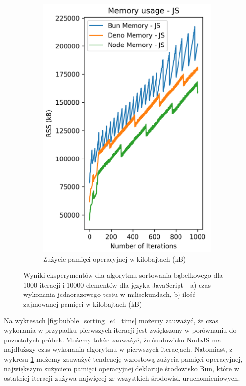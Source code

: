 \begin{figure}[H]
\begin{subfigure}[b]{0.42\textwidth}
  \end{subfigure}
  \begin{subfigure}[b]{0.42\textwidth}
    \centering
    \includegraphics[width=\textwidth]{Figures/sorting/sorting_bubble_1000_10000_js_memory.png}
    \caption{Zużycie pamięci operacyjnej w kilobajtach (kB)}
    \label{fig:bubble_sorting_e4_memory}
  \end{subfigure}
  \caption{Wyniki eksperymentów dla algorytmu sortowania bąbelkowego dla 1000 iteracji i 10000 elementów dla języka JavaScript - a) czas wykonania jednorazowego testu w milisekundach, b) ilość zajmowanej pamięci w kilobajtach (kB)}
  \label{fig:bubble_sorting_e4}
\end{figure}

Na wykresach \ref{fig:bubble_sorting_e4_time} możemy zauważyć, że czas wykonania w przypadku pierwszych iteracji jest zwiększony w porównaniu do pozostałych próbek. Możemy także zauważyć, że środowisko NodeJS ma najdłuższy czas wykonania algorytmu w pierwszych iteracjach. Natomiast, z wykresu \ref{fig:bubble_sorting_e4_memory} możemy zauważyć tendencję wzrostową zużycia pamięci operacyjnej, największym zużyciem pamięci operacyjnej deklaruje środowisko Bun, które w ostatniej iteracji zużywa najwięcej ze wszystkich środowisk uruchomieniowych.

